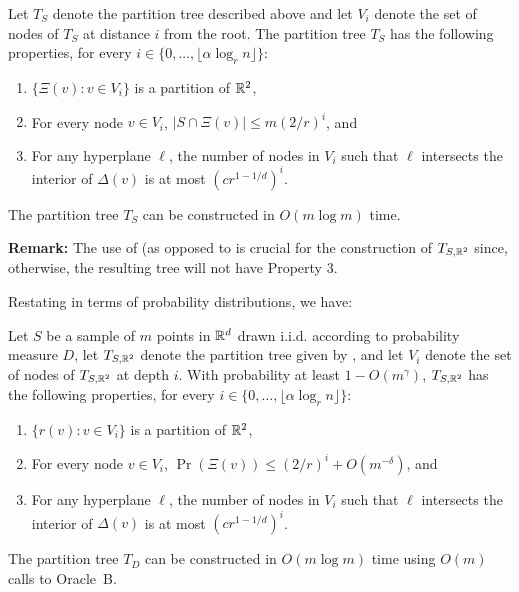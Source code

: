 \documentclass{patmorin}
\begin{document}
\begin{thm}
Let $T_S$ denote the partition tree described above and let $V_i$
denote the set of nodes of $T_S$ at distance $i$ from the root.
The partition tree $T_S$ has the following properties, for every
$i\in\{0,\ldots,\lfloor\alpha\log_r n\rfloor\}$:
\begin{enumerate}
  \item $\{\Xi(v) : v\in V_i\}$ is a partition of $\mathbb{R}^2$,  
  \item For every node $v\in V_i$, $|S\cap\Xi(v)| \le m(2/r)^i$, and 
  \item For any hyperplane $\ell$, the number of nodes in $V_i$ such that
        $\ell$ intersects the interior of $\Delta(v)$ is at most
        $(cr^{1-1/d})^i$.
  \end{enumerate}
  The partition tree $T_S$ can be constructed in $O(m\log m)$ time.
\end{thm}

\noindent\textbf{Remark:} The use of  (as
opposed to  is crucial for the construction
of $T_{S,\mathbb{R}^2}$ since, otherwise, the resulting tree will not have
Property 3.

Restating  in terms of probability distributions,
we have:

\begin{thm}
Let $S$ be a sample of $m$ points in $\mathbb{R}^d$ drawn i.i.d. according
to probability measure $D$, let $T_{S,\mathbb{R}^2}$ denote the partition
tree given by , and let $V_i$ denote the
set of nodes of $T_{S,\mathbb{R}^2}$ at depth $i$.  With probability at least
$1-O(m^{\gamma})$, $T_{S,\mathbb{R}^2}$ has the following properties, for every
$i\in\{0,\ldots,\lfloor\alpha\log_r n\rfloor\}$:
\begin{enumerate}
  \item $\{r(v) : v\in V_i\}$ is a partition of $\mathbb{R}^2$,  
  \item For every node $v\in V_i$, $\Pr(\Xi(v)) \le (2/r)^i+O(m^{-\delta})$, 
        and 
  \item For any hyperplane $\ell$, the number of nodes in $V_i$ such that
       $\ell$ intersects the interior of $\Delta(v)$ is at most
       $(cr^{1-1/d})^i$.
\end{enumerate}
The partition tree $T_D$ can be constructed in $O(m\log m)$ time using 
$O(m)$ calls to Oracle~B.
\end{thm}
\end{document}
